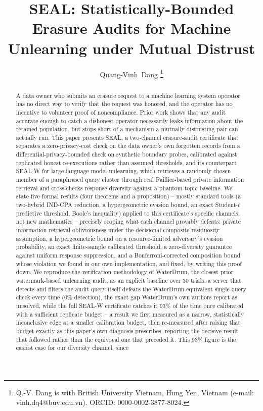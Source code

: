 \documentclass[10pt,journal,compsoc]{IEEEtran}
\begin{document}
\title{SEAL: Statistically-Bounded Erasure Audits for Machine Unlearning under Mutual Distrust}

\author{Quang-Vinh~Dang
\thanks{Q.-V. Dang is with British University Vietnam, Hung Yen, Vietnam (e-mail: vinh.dq4@buv.edu.vn). ORCID: 0000-0002-3877-8024.}
}


\maketitle

\begin{abstract}
A data owner who submits an erasure request to a machine learning system operator has no direct way to verify that the request was honored, and the operator has no incentive to volunteer proof of noncompliance. Prior work shows that any audit accurate enough to catch a dishonest operator necessarily leaks information about the retained population, but stops short of a mechanism a mutually distrusting pair can actually run. This paper presents SEAL, a two-channel erasure-audit certificate that separates a zero-privacy-cost check on the data owner's own forgotten records from a differential-privacy-bounded check on synthetic boundary probes, calibrated against replicated honest re-executions rather than assumed thresholds, and its counterpart SEAL-W for large language model unlearning, which retrieves a randomly chosen member of a paraphrased query cluster through real Paillier-based private information retrieval and cross-checks response diversity against a phantom-topic baseline. We state five formal results (four theorems and a proposition) -- mostly standard tools (a two-hybrid IND-CPA reduction, a hypergeometric evasion bound, an exact Student-$t$ predictive threshold, Boole's inequality) applied to this certificate's specific channels, not new mathematics -- precisely scoping what each channel provably defeats: private information retrieval obliviousness under the decisional composite residuosity assumption, a hypergeometric bound on a resource-limited adversary's evasion probability, an exact finite-sample calibrated threshold, a zero-diversity guarantee against uniform response suppression, and a Bonferroni-corrected composition bound whose violation we found in our own implementation, and fixed, by writing this proof down. We reproduce the verification methodology of WaterDrum, the closest prior watermark-based unlearning audit, as an explicit baseline over 30 trials: a server that detects and filters the audit query itself defeats the WaterDrum-equivalent single-query check every time (0\% detection), the exact gap WaterDrum's own authors report as unsolved, while the full SEAL-W certificate catches it 93\% of the time once calibrated with a sufficient replicate budget -- a result we first measured as a narrow, statistically inconclusive edge at a smaller calibration budget, then re-measured after raising that budget exactly as this paper's own diagnosis prescribes, reporting the decisive result that followed rather than the equivocal one that preceded it. This 93\% figure is the easiest case for our diversity channel, since 
\end{abstract}
\end{document}
